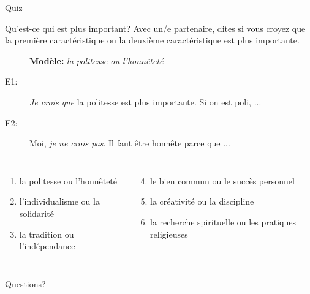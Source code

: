 \documentclass{beamer}
\begin{document}
  \begin{frame}{}
    \begin{center}
      \Large Quiz
    \end{center}
  \end{frame}

  \begin{frame}{Qu'est-ce qui est plus important?}
    Avec un/e partenaire, dites si \alert{vous croyez que} la première caractéristique ou la deuxième caractéristique est plus importante.
    \begin{description}
      \item[] \textbf{Modèle:} \emph{la politesse ou l'honnêteté}
      \item[E1:] \emph{Je crois que} la politesse est plus importante. Si on est poli, ...
      \item[E2:] Moi, \emph{je ne crois pas}. Il faut être honnête parce que ...
    \end{description}
    \begin{columns}[t]
        \begin{enumerate}
          \item la politesse ou l'honnêteté
          \item l'individualisme ou la solidarité
          \item la tradition ou l'indépendance
        \end{enumerate}
        \begin{enumerate}
          \setcounter{enumi}{3}
          \item le bien commun ou le succès personnel
          \item la créativité ou la discipline
          \item la recherche spirituelle ou les pratiques religieuses
        \end{enumerate}
    \end{columns}
  \end{frame}

  \begin{frame}{}
    \begin{center}
      \Large Questions?
    \end{center}
  \end{frame}
\end{document}

